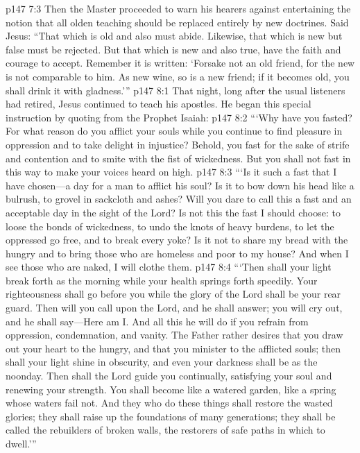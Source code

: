 \vs p147 7:3 Then the Master proceeded to warn his hearers against entertaining the notion that all olden teaching should be replaced entirely by new doctrines. Said Jesus: \textcolor{ubdarkred}{“That which is old and also  must abide. Likewise, that which is new but false must be rejected. But that which is new and also true, have the faith and courage to accept. Remember it is written: ‘Forsake not an old friend, for the new is not comparable to him. As new wine, so is a new friend; if it becomes old, you shall drink it with gladness.’”}
\vs p147 8:1 That night, long after the usual listeners had retired, Jesus continued to teach his apostles. He began this special instruction by quoting from the Prophet Isaiah:
\pc \vs p147 8:2 \textcolor{ubdarkred}{“‘Why have you fasted? For what reason do you afflict your souls while you continue to find pleasure in oppression and to take delight in injustice? Behold, you fast for the sake of strife and contention and to smite with the fist of wickedness. But you shall not fast in this way to make your voices heard on high.}\plusone
\vs p147 8:3 \textcolor{ubdarkred}{“‘Is it such a fast that I have chosen---a day for a man to afflict his soul? Is it to bow down his head like a bulrush, to grovel in sackcloth and ashes? Will you dare to call this a fast and an acceptable day in the sight of the Lord? Is not this the fast I should choose: to loose the bonds of wickedness, to undo the knots of heavy burdens, to let the oppressed go free, and to break every yoke? Is it not to share my bread with the hungry and to bring those who are homeless and poor to my house? And when I see those who are naked, I will clothe them.}
\vs p147 8:4 \textcolor{ubdarkred}{“‘Then shall your light break forth as the morning while your health springs forth speedily. Your righteousness shall go before you while the glory of the Lord shall be your rear guard. Then will you call upon the Lord, and he shall answer; you will cry out, and he shall say---Here am I. And all this he will do if you refrain from oppression, condemnation, and vanity. The Father rather desires that you draw out your heart to the hungry, and that you minister to the afflicted souls; then shall your light shine in obscurity, and even your darkness shall be as the noonday. Then shall the Lord guide you continually, satisfying your soul and renewing your strength. You shall become like a watered garden, like a spring whose waters fail not. And they who do these things shall restore the wasted glories; they shall raise up the foundations of many generations; they shall be called the rebuilders of broken walls, the restorers of safe paths in which to dwell.’”}
